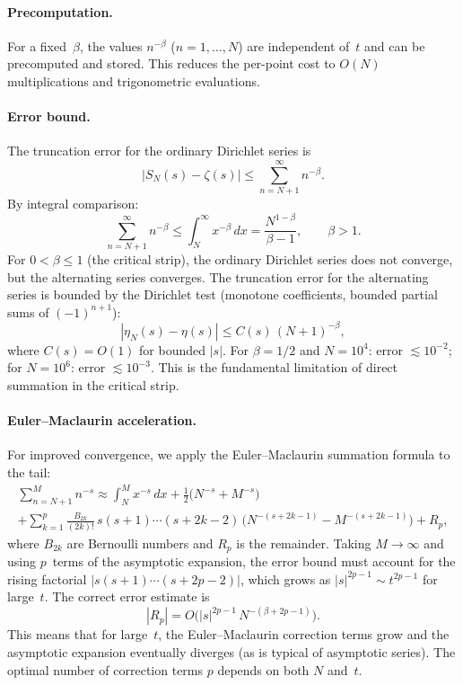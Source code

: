 \paragraph{Precomputation.}
For a fixed~$\beta$, the values $n^{-\beta}$ ($n = 1, \ldots, N$) are independent of~$t$
and can be precomputed and stored. This reduces the per-point cost to $O(N)$
multiplications and trigonometric evaluations.

\paragraph{Error bound.}
The truncation error for the ordinary Dirichlet series is
\begin{equation}\label{eq:trunc-ordinary}
  |S_N(s) - \zeta(s)| \le \sum_{n=N+1}^{\infty} n^{-\beta}.
\end{equation}
By integral comparison:
\begin{equation}\label{eq:integral-bound}
  \sum_{n=N+1}^{\infty} n^{-\beta}
  \le \int_{N}^{\infty} x^{-\beta}\,dx
  = \frac{N^{1-\beta}}{\beta - 1}, \qquad \beta > 1.
\end{equation}
For $0 < \beta \le 1$ (the critical strip), the ordinary Dirichlet series does not
converge, but the alternating series converges. The truncation error for the alternating
series is bounded by the Dirichlet test (monotone coefficients, bounded partial sums of
$(-1)^{n+1}$):
\begin{equation}\label{eq:trunc-alt}
  |\eta_N(s) - \eta(s)| \le C(s)\,(N+1)^{-\beta},
\end{equation}
where $C(s) = O(1)$ for bounded $|s|$. For $\beta = 1/2$ and $N = 10^4$: error
$\lesssim 10^{-2}$; for $N = 10^6$: error $\lesssim 10^{-3}$. This is the fundamental
limitation of direct summation in the critical strip.

\paragraph{Euler--Maclaurin acceleration.}
For improved convergence, we apply the Euler--Maclaurin summation formula to the tail:
\begin{multline}\label{eq:euler-maclaurin}
  \sum_{n=N+1}^{M} n^{-s}
  \approx \int_{N}^{M} x^{-s}\,dx + \frac{1}{2}\bigl(N^{-s} + M^{-s}\bigr) \\
  + \sum_{k=1}^{p} \frac{B_{2k}}{(2k)!}\,
  s(s+1)\cdots(s+2k-2)\,\bigl(N^{-(s+2k-1)} - M^{-(s+2k-1)}\bigr) + R_p,
\end{multline}
where $B_{2k}$ are Bernoulli numbers and $R_p$ is the remainder. Taking $M \to \infty$
and using $p$~terms of the asymptotic expansion, the error bound must account for the
rising factorial $|s(s{+}1)\cdots(s{+}2p{-}2)|$, which grows as $|s|^{2p-1} \sim t^{2p-1}$
for large~$t$. The correct error estimate is
\begin{equation}\label{eq:em-error}
  |R_p| = O\bigl(|s|^{2p-1}\,N^{-(\beta+2p-1)}\bigr).
\end{equation}
This means that for large~$t$, the Euler--Maclaurin correction terms grow and the
asymptotic expansion eventually diverges (as is typical of asymptotic series). The
optimal number of correction terms $p$ depends on both $N$ and~$t$.

